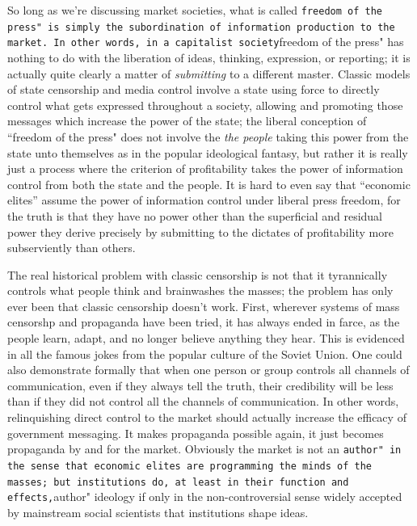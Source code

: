 \documentclass[12pt,book]{article}
\begin{document}
So long as we're discussing market societies, what is called
\texttt{freedom of the press" is simply the subordination of information production to the market. In other words, in a capitalist society}freedom
of the press" has nothing to do with the liberation of ideas, thinking,
expression, or reporting; it is actually quite clearly a matter of
\emph{submitting} to a different master. Classic models of state
censorship and media control involve a state using force to directly
control what gets expressed throughout a society, allowing and promoting
those messages which increase the power of the state; the liberal
conception of ``freedom of the press" does not involve the \emph{the
people} taking this power from the state unto themselves as in the
popular ideological fantasy, but rather it is really just a process
where the criterion of profitability takes the power of information
control from both the state and the people. It is hard to even say that
``economic elites'' assume the power of information control under
liberal press freedom, for the truth is that they have no power other
than the superficial and residual power they derive precisely by
submitting to the dictates of profitability more subserviently than
others.

The real historical problem with classic censorship is not that it
tyrannically controls what people think and brainwashes the masses; the
problem has only ever been that classic censorship doesn't work. First,
wherever systems of mass censorshp and propaganda have been tried, it
has always ended in farce, as the people learn, adapt, and no longer
believe anything they hear. This is evidenced in all the famous jokes
from the popular culture of the Soviet Union. One could also demonstrate
formally that when one person or group controls all channels of
communication, even if they always tell the truth, their credibility
will be less than if they did not control all the channels of
communication. In other words, relinquishing direct control to the
market should actually increase the efficacy of government messaging. It
makes propaganda possible again, it just becomes propaganda by and for
the market. Obviously the market is not an
\texttt{author" in the sense that economic elites are programming the minds of the masses; but institutions do, at least in their function and effects,}author"
ideology if only in the non-controversial sense widely accepted by
mainstream social scientists that institutions shape ideas.
\end{document}
